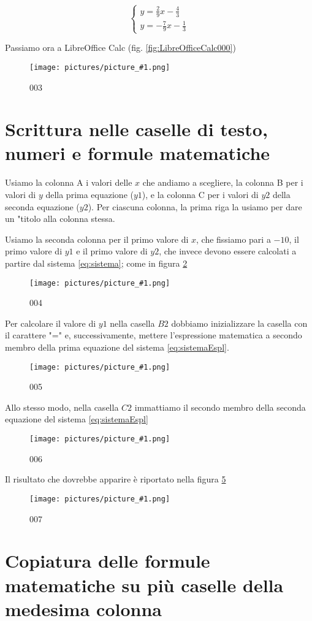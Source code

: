 \documentclass[17pt]{extarticle}
\newcommand{\pict}[1]{
\begin{figure}[h!]		
	\centering
   	\texttt{[image: pictures/picture\_\#1.png]}
  	\caption{#1}
   	\label{fig:LibreOfficeCalc#1}
\end{figure}
}
\begin{document}
\begin{equation}\label{eq:sistemaEspl}
  	\begin{cases}
		y = \frac{2}{9}x - \frac{4}{3}\\
		y = -\frac{7}{9}x - \frac{1}{3}
	\end{cases}
\end{equation}


Passiamo ora a LibreOffice Calc (fig. \ref{fig:LibreOfficeCalc000})
%

\pict{003}

\newpage

\section{Scrittura nelle caselle di testo, numeri e formule matematiche}

Usiamo la colonna A i valori delle $x$ che andiamo a scegliere, la colonna B per i valori di $y$ della prima equazione ($y1$), e la colonna C per i valori di $y2$ della seconda equazione ($y2$). Per ciascuna colonna, la prima riga la usiamo per dare un "titolo alla colonna stessa.

Usiamo la seconda colonna per il primo valore di $x$, che fissiamo pari a $-10$, il primo valore di $y1$ e il primo valore di $y2$, che invece devono essere calcolati a partire dal sistema \ref{eq:sistema}; come in figura \ref{fig:LibreOfficeCalc004}

%
\pict{004}

Per calcolare il valore di $y1$ nella casella $B2$ dobbiamo inizializzare la casella con il carattere "=" e, successivamente, mettere l'espressione matematica a secondo membro della prima equazione del sistema \ref{eq:sistemaEspl}.

%
\pict{005}

Allo stesso modo, nella casella $C2$ immattiamo il secondo membro della seconda equazione del sistema \ref{eq:sistemaEspl}

%
\pict{006}


Il risultato che dovrebbe apparire è riportato nella figura \ref{fig:LibreOfficeCalc007}


%
\pict{007}


\newpage
\section{Copiatura delle formule matematiche su più caselle della medesima colonna}
\end{document}
